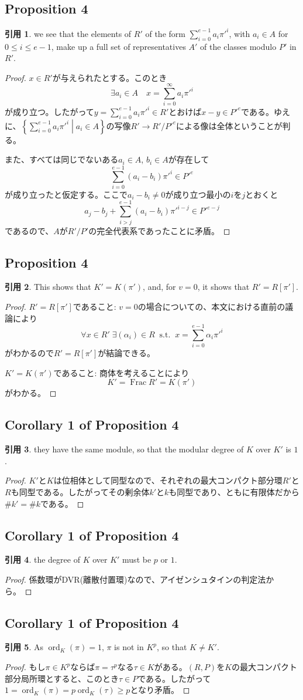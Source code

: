 \documentclass[12pt]{jsarticle}%
\renewenvironment{leftbar}{%
  \renewcommand\FrameCommand{\vrule width 1pt \hspace{10pt}}%
  \MakeFramed {\advance\hsize-\width \FrameRestore}}%
 {\endMakeFramed}
\newcommand{\barquo}[1]{\begin{leftbar} \begin{quo} #1 \end{quo} \end{leftbar}}%
\newcommand{\bfsubsection}[1]{\subsection*{\textbf{#1}}}
\theoremstyle{definition}%
\newtheorem*{quo}{引用}
\newcommand{\setmid}[2]{\left\{ #1 \mathrel{} \middle| \mathrel{} #2 \right\}}%
\newcommand{\st}{\; \; \text{s.t.} \; \;}%
\DeclareMathOperator{\ord}{ord}
\DeclareMathOperator{\Frac}{Frac}%
\newcommand{\gra}{{\alpha}}
\begin{document}
\bfsubsection{Proposition 4}
\barquo{
we see that the elements of $R'$ of the form $\sum_{i=0}^{e-1} a_i \pi'^i$, with $a_i \in A$ for $0 \leq i \leq e-1$, make up a full set of representatives $A'$ of the classes modulo $P'$ in $R'$.
}
\begin{proof}
  $x \in R'$が与えられたとする。このとき
  \[
  \exists a_i \in A \quad x = \sum_{i=0}^{\infty} a_i \pi'^i
  \]
  が成り立つ。したがって$y = \sum_{i=0}^{e-1} a_i \pi'^i \in R'$とおけば$x - y \in P'^e$である。ゆえに、$\setmid{\sum_{i=0}^{e-1} a_i \pi'^i}{a_i \in A}$の写像$R' \to R'/ P'^e$による像は全体ということが判る。

  また、すべては同じでないある$a_i \in A$, $b_i \in A$が存在して
  \[
  \sum_{i=0}^{e-1} (a_i- b_i) \pi'^i \in P'^e
  \]
  が成り立ったと仮定する。ここで$a_i - b_i \neq 0$が成り立つ最小の$i$を$j$とおくと
  \[
  a_j - b_j + \sum_{i > j}^{e-1} (a_i- b_i) \pi'^{i-j} \in P'^{e-j}
  \]
  であるので、$A$が$R'/P'$の完全代表系であったことに矛盾。
\end{proof}


\bfsubsection{Proposition 4}
\barquo{
This shows that $K' = K(\pi')$, and, for $v=0$, it shows that $R' = R[\pi']$.
}
\begin{proof}
  $R' = R[\pi']$であること: $v=0$の場合についての、本文における直前の議論により
  \[
  \forall x \in R' \; \exists (\gra_i) \in R \st x = \sum_{i=0}^{e-1} \gra_i \pi'^i
  \]
  がわかるので$R' = R[\pi']$が結論できる。

  $K' =K(\pi')$であること: 商体を考えることにより
  \[
  K' = \Frac R' = K(\pi')
  \]
  がわかる。
\end{proof}




\bfsubsection{Corollary 1 of Proposition 4}
\barquo{
they have the same module, so that the modular degree of $K$ over $K'$ is $1$.
}
\begin{proof}
  $K'$と$K$は位相体として同型なので、それぞれの最大コンパクト部分環$R'$と$R$も同型である。したがってその剰余体$k'$と$k$も同型であり、ともに有限体だから$\# k' = \# k$である。
\end{proof}


\bfsubsection{Corollary 1 of Proposition 4}
\barquo{
the degree of $K$ over $K'$ must be $p$ or $1$.
}
\begin{proof}
  係数環がDVR(離散付置環)なので、アイゼンシュタインの判定法から。
\end{proof}


\bfsubsection{Corollary 1 of Proposition 4}
\barquo{
As $\ord_K(\pi) = 1$, $\pi$ is not in $K^p$, so that $K \neq K'$.
}
\begin{proof}
  もし$\pi \in K^p$ならば$\pi = \tau^p$なる$\tau \in K$がある。$(R,P)$を$K$の最大コンパクト部分局所環とすると、このとき$\tau \in P$である。したがって$1 = \ord_K(\pi) = p \ord_K(\tau) \geq p$となり矛盾。
\end{proof}
\end{document}
